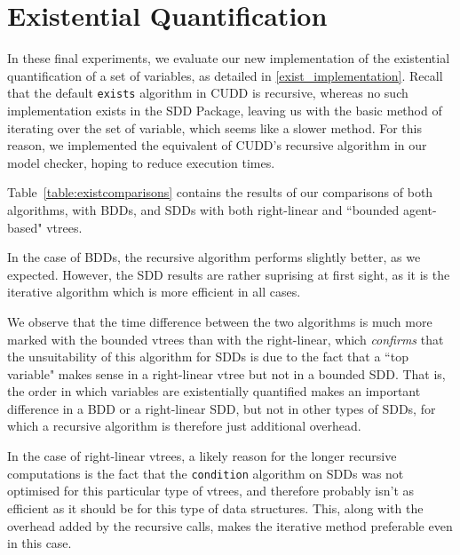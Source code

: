 \documentclass[11pt]{report}
\begin{document}
\section{Existential Quantification}

In these final experiments, we evaluate our new implementation of the existential quantification of a set of variables, as detailed in \ref{exist_implementation}. Recall that the default \texttt{exists} algorithm in CUDD is recursive, whereas no such implementation exists in the SDD Package, leaving us with the basic method of iterating over the set of variable, which seems like a slower method. For this reason, we implemented the equivalent of CUDD's recursive algorithm in our model checker, hoping to reduce execution times. 

Table~\ref{table:existcomparisons} contains the results of our comparisons of both algorithms, with BDDs, and SDDs with both right-linear and ``bounded agent-based" vtrees. 

In the case of BDDs, the recursive algorithm performs slightly better, as we expected. However, the SDD results are rather suprising at first sight, as it is the iterative algorithm which is more efficient in all cases.

We observe that the time difference between the two algorithms is much more marked with the bounded vtrees than with the right-linear, which \textit{confirms} that the unsuitability of this algorithm for SDDs is due to the fact that a ``top variable" makes sense in a right-linear vtree but not in a bounded SDD. That is, the order in which variables are existentially quantified makes an important difference in a BDD or a right-linear SDD, but not in other types of SDDs, for which a recursive algorithm is therefore just additional overhead. 

In the case of right-linear vtrees, a likely reason for the longer recursive computations is the fact that the \texttt{condition} algorithm on SDDs was not optimised for this particular type of vtrees, and therefore probably isn't as efficient as it should be for this type of data structures. This, along with the overhead added by the recursive calls, makes the iterative method preferable even in this case. 
\end{document}
